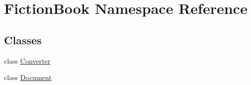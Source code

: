 \hypertarget{namespaceFictionBook}{\section{Fiction\+Book Namespace Reference}
\label{namespaceFictionBook}
}
\subsection*{Classes}
\begin{DoxyCompactItemize}
\item 
class \hyperlink{classFictionBook_1_1Converter}{Converter}
\item 
class \hyperlink{classFictionBook_1_1Document}{Document}
\end{DoxyCompactItemize}

